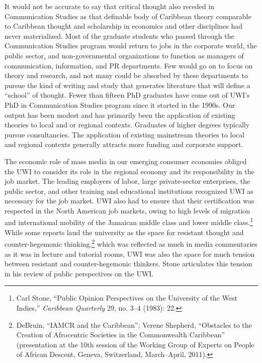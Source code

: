\documentclass{tufte-handout}
\begin{document}
It would not be accurate to say that critical thought also receded in
Communication Studies as that definable body of Caribbean theory
comparable to Caribbean thought and scholarship in economics and other
disciplines had never materialized. Most of the graduate students who
passed through the Communication Studies program would return to jobs in
the corporate world, the public sector, and non-governmental
organizations to function as managers of communication, information, and
PR departments. Few would go on to focus on theory and research, and not
many could be absorbed by these departments to pursue the kind of
writing and study that generates literature that will define a
``school'' of thought. Fewer than fifteen PhD graduates have come out of
UWI's PhD in Communication Studies program since it started in the
1990s. Our output has been modest and has primarily been the application
of existing theories to local and or regional contexts. Graduates of
higher degrees typically pursue consultancies. The application of
existing mainstream theories to local and regional contexts generally
attracts more funding and corporate support.

The economic role of mass media in our emerging consumer economies
obliged the UWI to consider its role in the regional economy and its
responsibility in the job market. The leading employers of labor, large
private-sector enterprises, the public sector, and other training and
educational institutions recognized UWI as necessary for the job market.
UWI also had to ensure that their certification was respected in the
North American job markets, owing to high levels of migration and
international mobility of the Jamaican middle class and lower middle
class.\footnote{Carl Stone, ``Public Opinion Perspectives on the
  University of the West Indies,'' \emph{Caribbean Quarterly} 29, no.
  3--4 (1983): 22.} While some reports laud the university as the space
for resistant thought and counter-hegemonic thinking,\footnote{DeBruin,
  ``IAMCR and the Caribbean''; Verene Shepherd, ``Obstacles to the
  Creation of Afrocentric Societies in the Commonwealth Caribbean''
  (presentation at the 10th session of the Working Group of Experts on
  People of African Descent, Geneva, Switzerland, March--April, 2011).}
which was reflected as much in media commentaries as it was in lecture
and tutorial rooms, UWI was also the space for much tension between
resistant and counter-hegemonic thinkers. Stone articulates this tension
in his review of public perspectives on the UWI.
\end{document}
